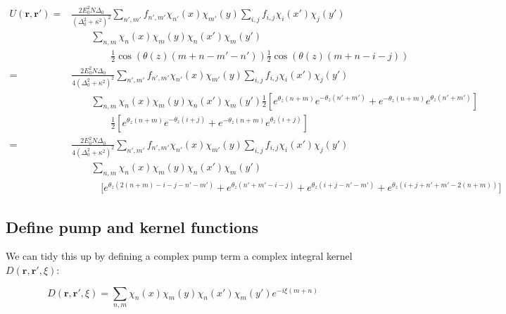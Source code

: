 \documentclass[a4paper,nobalancelastpage]{revtex4-1}
\newcommand{\vect}[1]{\bm{#1}}
\newcommand{\cosexpansion}[2] {\frac{1}{2} \left[ e^{#1} e^{-#2} +e^{-#1}e^{#2} \right]}
\newcommand{\expn}[1] {e^{#1}}
\begin{document}
\begin{align}
U(\vect{r},\vect{r}')=& \frac{ 2E^2_0 N \Delta_0 }{(\Delta_0^2+\kappa^2)^2} \sum_{n',m'}
 f_{n',m'} \chi_{n'}\left( x \right)
  \chi_{m'}\left( y \right) 
   \sum_{i,j} f_{i,j} \chi_i\left( x' \right) \chi_j\left( y' \right)  
  \nonumber 
\\ 
 &\qquad \sum_{n,m}
  \chi_n\left( x \right)
  \chi_m\left( y \right) 
  \chi_n\left( x' \right) \chi_m\left( y' \right) \nonumber 
\\ 
 &\qquad \qquad \frac{1}{2} \cos \left( \theta(z) (m+n-m'-n') \right) \frac{1}{2}    
 \cos \left( \theta(z) (m+n-i-j) \right)    \nonumber 
\\ 
=& \frac{ 2E^2_0 N \Delta_0 }{4(\Delta_0^2+\kappa^2)^2} \sum_{n',m'}
 f_{n',m'} \chi_{n'}\left( x \right)
  \chi_{m'}\left( y \right) 
   \sum_{i,j} f_{i,j} \chi_i\left( x' \right) \chi_j\left( y' \right)  
 \nonumber 
\\ 
 & \qquad \sum_{n,m}
\chi_n\left( x \right)
  \chi_m\left( y \right) 
  \chi_n\left( x' \right) \chi_m\left( y' \right) 
\cosexpansion{\theta_z(n+m)}{\theta_z(n'+m')}
 \nonumber 
\\
& \qquad \qquad \cosexpansion{\theta_z(n+m)}{\theta_z(i+j)} \nonumber 
\\
=&\frac{ 2E^2_0 N \Delta_0 }{4(\Delta_0^2+\kappa^2)^2} \sum_{n',m'}
 f_{n',m'} \chi_{n'}\left( x \right)
  \chi_{m'}\left( y \right) 
   \sum_{i,j} f_{i,j} \chi_i\left( x' \right) \chi_j\left( y' \right)  
   \nonumber 
\\
& \qquad \sum_{n,m}
\chi_n\left( x \right)
  \chi_m\left( y \right) 
  \chi_n\left( x' \right) \chi_m\left( y' \right)  \nonumber 
\\ 
& \qquad \quad \big[
   \expn{\theta_z (2(n+m)-i-j-n'-m')} +
   \expn{\theta_z (n'+m'-i-j)}   +
   \expn{\theta_z (i+j-n'-m')} +
   \expn{\theta_z (i+j+n'+m'-2(n+m))}
  \big]
\end{align}

\subsection{Define pump and kernel functions}

We can tidy this up by defining a complex pump term a complex integral kernel $D(\vect{r},\vect{r}',\xi)$:

\begin{equation}
D(\vect{r},\vect{r}',\xi)= \sum_{n,m} \chi_{n}\left( x \right)
  \chi_{m}\left( y \right) \chi_{n}\left( x' \right)
  \chi_{m}\left( y' \right)  \expn{-i \xi (m+n)}
\end{equation}
\end{document}
